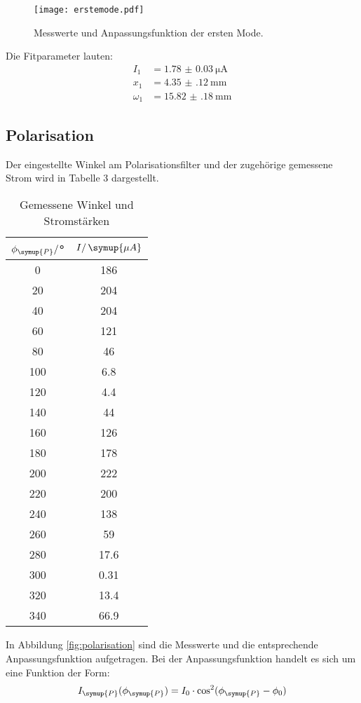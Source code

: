 \begin{figure}[H]
  \centering
  \texttt{[image: erstemode.pdf]}
  \caption{Messwerte und Anpassungsfunktion der ersten Mode.}
  \label{fig:erstemode}
\end{figure}

Die Fitparameter lauten:
\begin{align*}
  I_1 &= \SI{1.78(3)}{\micro\ampere} \\
  x_1 &= \SI{4.35(12)}{\milli\meter} \\
  \omega_1 &= \SI{15.82(18)}{\milli\meter}
\end{align*}

\subsection{Polarisation}
Der eingestellte Winkel am Polarisationsfilter und der zugehörige gemessene Strom
wird in Tabelle 3 dargestellt.

\begin{table}[H]
\centering
\caption{Gemessene Winkel und Stromstärken}
\begin{tabular}{c c}
  \toprule
    {$\phi_{\symup{P}}/$°} & {$I/\, \symup{\mu A}$} \\
    \midrule
    0   &   186  \\
    20  &   204  \\
    40  &   204  \\
    60  &   121  \\
    80  &    46  \\
    100 &   6.8  \\
    120 &   4.4  \\
    140 &    44  \\
    160 &   126  \\
    180 &   178  \\
    200 &   222  \\
    220 &   200  \\
    240 &   138  \\
    260 &    59  \\
    280 &  17.6  \\
    300 &  0.31  \\
    320 &  13.4  \\
    340 &  66.9  \\
    \bottomrule
  \end{tabular}
\end{table}

In Abbildung \ref{fig:polarisation} sind die Messwerte und die entsprechende
Anpassungsfunktion aufgetragen. Bei der Anpassungsfunktion handelt es sich um eine
Funktion der Form:
\begin{equation*}
  I_\symup{P}(\phi_\symup{P}) = I_0 \cdot \cos^2(\phi_\symup{P} - \phi_0)
\end{equation*}

